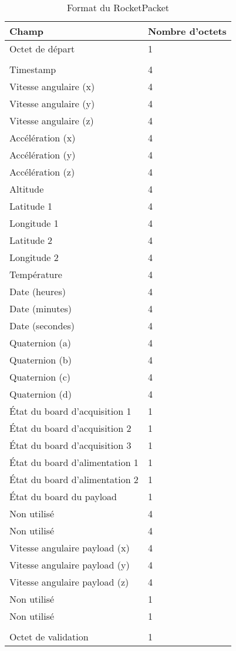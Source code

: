 \begin{table}
    \centering
    \begin{tabular}{|l|l|}
        \hline
        \textbf{Champ} & \textbf{Nombre d'octets} \\
        \hline
        Octet de départ & 1 \\
        &\\
        Timestamp & 4 \\
        Vitesse angulaire (x) & 4 \\
        Vitesse angulaire (y) & 4 \\
        Vitesse angulaire (z) & 4 \\
        Accélération (x) & 4 \\
        Accélération (y) & 4 \\
        Accélération (z) & 4 \\
        Altitude & 4 \\
        Latitude 1 & 4 \\
        Longitude 1 & 4 \\
        Latitude 2 & 4 \\
        Longitude 2 & 4 \\
        Température & 4 \\
        Date (heures) & 4 \\
        Date (minutes) & 4 \\
        Date (secondes) & 4 \\
        Quaternion (a) & 4 \\
        Quaternion (b) & 4 \\
        Quaternion (c) & 4 \\
        Quaternion (d) & 4 \\
        État du board d'acquisition 1 & 1 \\
        État du board d'acquisition 2 & 1 \\
        État du board d'acquisition 3 & 1 \\
        État du board d'alimentation 1 & 1 \\
        État du board d'alimentation 2 & 1 \\
        État du board du payload & 1 \\
        Non utilisé & 4 \\
        Non utilisé & 4 \\
        Vitesse angulaire payload (x) & 4 \\
        Vitesse angulaire payload (y) & 4 \\
        Vitesse angulaire payload (z) & 4 \\
        Non utilisé & 1 \\
        Non utilisé & 1 \\
        &\\
        Octet de validation & 1 \\
        \hline
    \end{tabular}
    \caption{Format du RocketPacket}
    \label{LogicielRealisationFormatPacket}
\end{table}

